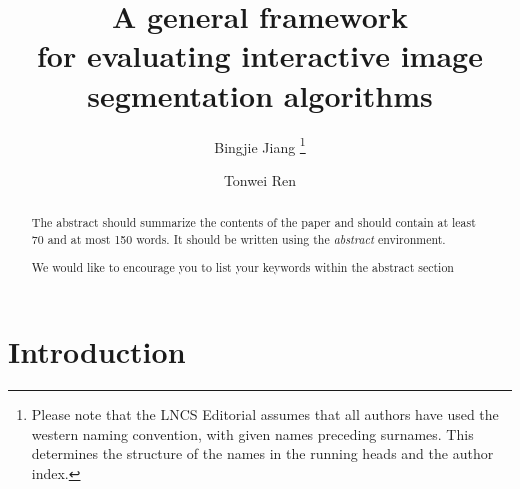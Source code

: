 \documentclass[runningheads,a4paper]{llncs}
\newcommand{\keywords}[1]{\par\addvspace\baselineskip
\noindent\keywordname\enspace\ignorespaces#1}
\begin{document}
\mainmatter  %

\title{A general framework \\for evaluating interactive 
image segmentation algorithms}


%
%
\author{Bingjie Jiang%
\thanks{Please note that the LNCS Editorial assumes that all authors have used
the western naming convention, with given names preceding surnames. This determines
the structure of the names in the running heads and the author index.}%
\and Tonwei Ren}
%




\maketitle


\begin{abstract}
The abstract should summarize the contents of the paper and should
contain at least 70 and at most 150 words. It should be written using the
\emph{abstract} environment.
\keywords{We would like to encourage you to list your keywords within
the abstract section}
\end{abstract}


\section{Introduction}
\end{document}
